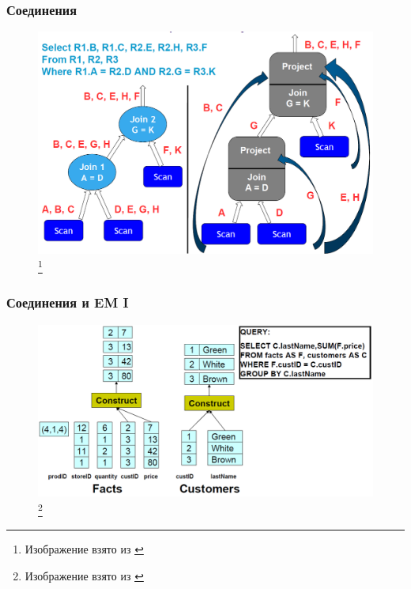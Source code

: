 \documentclass{beamer}
\begin{document}
\begin{frame}
\frametitle{Соединения}

\begin{figure}[htb]
\includegraphics[width=\textwidth,height=0.75\textheight,keepaspectratio]{join1.png} 
\footnote{\tiny{Изображение взято из \cite{Harizopoulos2009}}}
 \end{figure}    

\end{frame}

\begin{frame}
\frametitle{Соединения и EM I}

\begin{figure}[htb]
\includegraphics[width=\textwidth,height=0.75\textheight,keepaspectratio]{em-join1.png} 
\footnote{\tiny{Изображение взято из \cite{Harizopoulos2009}}}
 \end{figure}    

\end{frame}
\end{document}
